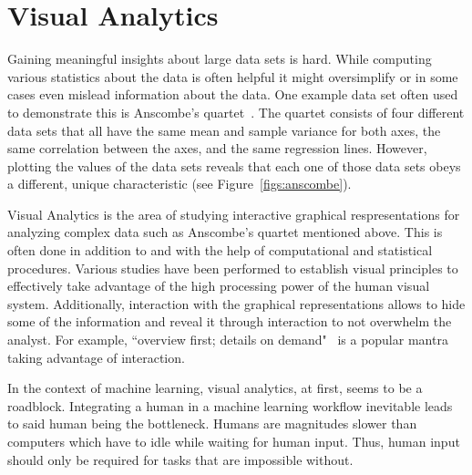 \section{Visual Analytics}
Gaining meaningful insights about large data sets is hard.
While computing various statistics about the data is often helpful it might oversimplify or in some cases even mislead information about the data.
One example data set often used to demonstrate this is Anscombe's quartet~\cite{doi:10.1080/00031305.1973.10478966}.
The quartet consists of four different data sets that all have the same mean and sample variance for both axes, the same correlation between the axes, and the same regression lines.
However, plotting the values of the data sets reveals that each one of those data sets obeys a different, unique characteristic (see Figure~\ref{figs:anscombe}).

Visual Analytics is the area of studying interactive graphical respresentations for analyzing complex data such as Anscombe's quartet mentioned above.
This is often done in addition to and with the help of computational and statistical procedures.
Various studies \cite{doi:10.1080/01621459.1984.10478080,Treisman:1985:PPV:5088.5091,Chang:2002:GTV:820060.820062} have been performed to establish visual principles to effectively take advantage of the high processing power of the human visual system.
Additionally, interaction with the graphical representations allows to hide some of the information and reveal it through interaction to not overwhelm the analyst.
For example, ``overview first; details on demand"~\cite{Shneiderman96theeyes} is a popular mantra taking advantage of interaction.

In the context of machine learning, visual analytics, at first, seems to be a roadblock.
Integrating a human in a machine learning workflow inevitable leads to said human being the bottleneck.
Humans are magnitudes slower than computers which have to idle while waiting for human input.
Thus, human input should only be required for tasks that are impossible without.

